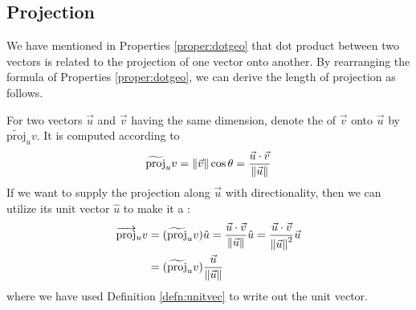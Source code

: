 \subsection{Projection}
We have mentioned in Properties \ref{proper:dotgeo} that dot product between two vectors is related to the projection of one vector onto another. By rearranging the formula of Properties \ref{proper:dotgeo}, we can derive the length of projection as follows.
\begin{center}
\end{center}
\begin{proper}
\label{proper:proj}
For two vectors $\vec{u}$ and $\vec{v}$ having the same dimension, denote the  of $\vec{v}$ onto $\vec{u}$ by $\widetilde{\text{proj}}_u v$. It is computed according to
\begin{align*}
\widetilde{\text{proj}}_u v = \norm{\vec{v}} \cos\theta = \frac{\vec{u} \cdot \vec{v}}{\norm{\vec{u}}}    
\end{align*}
If we want to supply the projection along $\vec{u}$ with directionality, then we can utilize its unit vector $\hat{u}$ to make it a :
\begin{align*}
\overrightarrow{\text{proj}}_u v &= (\widetilde{\text{proj}}_u v) \hat{u} = \frac{\vec{u} \cdot \vec{v}} {\norm{\vec{u}}} \hat{u} = \frac{\vec{u} \cdot \vec{v}}{\norm{\vec{u}}^2} \vec{u} \\
&= (\widetilde{\text{proj}}_u v) \frac{\vec{u}}{\norm{\vec{u}}}
\end{align*}
where we have used Definition \ref{defn:unitvec} to write out the unit vector.
\end{proper}

